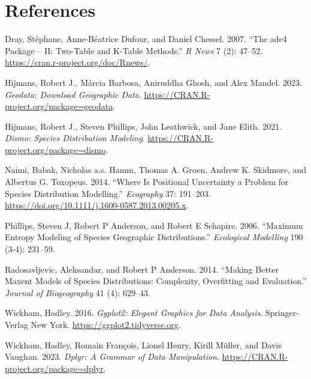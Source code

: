 \documentclass[
]{article}
\newlength{\cslhangindent}
\newlength{\cslentryspacingunit} %
\newenvironment{CSLReferences}[2] %
 {%
  \setlength{\parindent}{0pt}
  \ifodd #1
  \let\oldpar\par
  \def\par{\hangindent=\cslhangindent\oldpar}
  \fi
  \setlength{\parskip}{#2\cslentryspacingunit}
 }%
 {}
\begin{document}
\hypertarget{references}{%
\section*{References}\label{references}}

\hypertarget{refs}{}
\begin{CSLReferences}{1}{0}
\leavevmode{}%
Dray, Stéphane, Anne-Béatrice Dufour, and Daniel Chessel. 2007. {``The
{ade4} Package -- {II}: Two-Table and {K}-Table Methods.''} \emph{R
News} 7 (2): 47--52. \url{https://cran.r-project.org/doc/Rnews/}.

\leavevmode{}%
Hijmans, Robert J., Márcia Barbosa, Aniruddha Ghosh, and Alex Mandel.
2023. \emph{Geodata: Download Geographic Data}.
\url{https://CRAN.R-project.org/package=geodata}.

\leavevmode{}%
Hijmans, Robert J., Steven Phillips, John Leathwick, and Jane Elith.
2021. \emph{Dismo: Species Distribution Modeling}.
\url{https://CRAN.R-project.org/package=dismo}.

\leavevmode{}%
Naimi, Babak, Nicholas a.s. Hamm, Thomas A. Groen, Andrew K. Skidmore,
and Albertus G. Toxopeus. 2014. {``Where Is Positional Uncertainty a
Problem for Species Distribution Modelling.''} \emph{Ecography} 37:
191--203. \url{https://doi.org/10.1111/j.1600-0587.2013.00205.x}.

\leavevmode{}%
Phillips, Steven J, Robert P Anderson, and Robert E Schapire. 2006.
{``Maximum Entropy Modeling of Species Geographic Distributions.''}
\emph{Ecological Modelling} 190 (3-4): 231--59.

\leavevmode{}%
Radosavljevic, Aleksandar, and Robert P Anderson. 2014. {``Making Better
Maxent Models of Species Distributions: Complexity, Overfitting and
Evaluation.''} \emph{Journal of Biogeography} 41 (4): 629--43.

\leavevmode{}%
Wickham, Hadley. 2016. \emph{Ggplot2: Elegant Graphics for Data
Analysis}. Springer-Verlag New York.
\url{https://ggplot2.tidyverse.org}.

\leavevmode{}%
Wickham, Hadley, Romain François, Lionel Henry, Kirill Müller, and Davis
Vaughan. 2023. \emph{Dplyr: A Grammar of Data Manipulation}.
\url{https://CRAN.R-project.org/package=dplyr}.

\end{CSLReferences}
\end{document}
